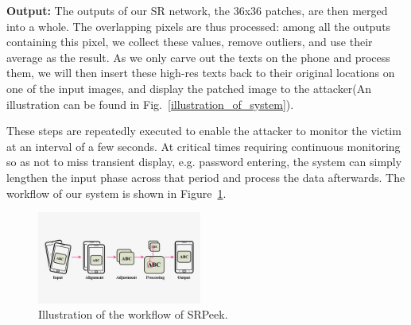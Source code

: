 \vspace{1mm}
\noindent
\textbf{Output:} The outputs of our SR network, the 36x36 patches, are then merged into a whole. The overlapping pixels are thus processed: among all the outputs containing this pixel, we collect these values, remove outliers, and use their average as the result. As we only carve out the texts on the phone and process them, we will then insert these high-res texts back to their original locations on one of the input images, and display the patched image to the attacker(An illustration can be found in Fig.~\ref{illustration_of_system}).

These steps are repeatedly executed to enable the attacker to monitor the victim at an interval of a few seconds. At critical times requiring continuous monitoring so as not to miss transient display, e.g. password entering, the system can simply lengthen the input phase across that period and process the data afterwards. The workflow of our system is shown in Figure~\ref{fig-workflow}.
\begin{figure}
  \centering
     \includegraphics[width=0.48\textwidth]{./pic/workflow_cl.pdf}
     \caption{Illustration of the workflow of \textsf{SRPeek}.}
     \label{fig-workflow}
\end{figure}

